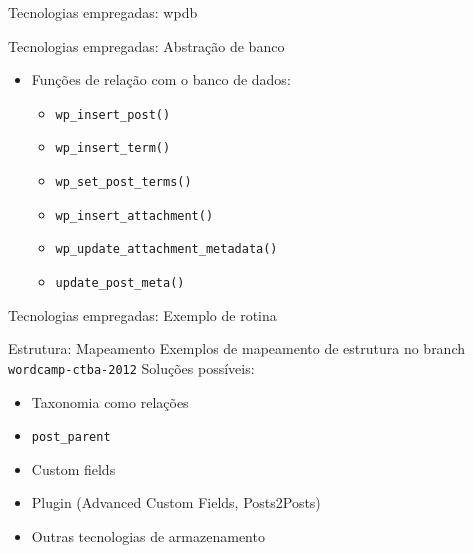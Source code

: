 \documentclass{beamer}
\begin{document}
\begin{frame}{Tecnologias empregadas: wpdb}
  
\end{frame}

\begin{frame}{Tecnologias empregadas: Abstração de banco}
    \begin{itemize}
    \pause \item Funções de relação com o banco de dados:
    \begin{itemize}
      \pause \item \texttt{wp\_insert\_post()}
      \pause \item \texttt{wp\_insert\_term()}
      \pause \item \texttt{wp\_set\_post\_terms()}
      \pause \item \texttt{wp\_insert\_attachment()}
      \pause \item \texttt{wp\_update\_attachment\_metadata()}
      \pause \item \texttt{update\_post\_meta()}
    \end{itemize}
  \end{itemize}
\end{frame}

\begin{frame}{Tecnologias empregadas: Exemplo de rotina}
  
\end{frame}

\begin{frame}{Estrutura: Mapeamento}
  \pause Exemplos de mapeamento de estrutura no branch \texttt{wordcamp-ctba-2012}
  \pause Soluções possíveis:
  \begin{itemize}
    \item Taxonomia como relações
    \item \texttt{post\_parent}
    \item Custom fields
    \item Plugin (Advanced Custom Fields, Posts2Posts)
    \item Outras tecnologias de armazenamento
  \end{itemize}
\end{frame}
\end{document}
